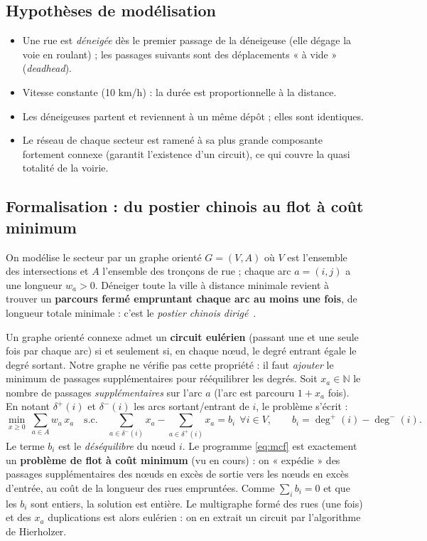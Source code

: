 \documentclass[11pt,a4paper]{article}
\begin{document}
\subsection{Hypothèses de modélisation}
\begin{itemize}
\item Une rue est \emph{déneigée} dès le premier passage de la déneigeuse (elle
dégage la voie en roulant) ; les passages suivants sont des déplacements
« à vide » (\emph{deadhead}).
\item Vitesse constante (10 km/h) : la durée est proportionnelle à la distance.
\item Les déneigeuses partent et reviennent à un même dépôt ; elles sont
identiques.
\item Le réseau de chaque secteur est ramené à sa plus grande composante
fortement connexe (garantit l'existence d'un circuit), ce qui couvre la quasi
totalité de la voirie.
\end{itemize}

\subsection{Formalisation : du postier chinois au flot à coût minimum}
On modélise le secteur par un graphe orienté $G=(V,A)$ où $V$ est l'ensemble des
intersections et $A$ l'ensemble des tronçons de rue ; chaque arc $a=(i,j)$ a une
longueur $w_a>0$. Déneiger toute la ville à distance minimale revient à trouver
un \textbf{parcours fermé empruntant chaque arc au moins une fois}, de longueur
totale minimale : c'est le \emph{postier chinois dirigé}~\cite{edmonds1973}.

Un graphe orienté connexe admet un \textbf{circuit eulérien} (passant une et une
seule fois par chaque arc) si et seulement si, en chaque nœud, le degré entrant
égale le degré sortant. Notre graphe ne vérifie pas cette propriété : il faut
\emph{ajouter} le minimum de passages supplémentaires pour rééquilibrer les
degrés. Soit $x_a\in\mathbb{N}$ le nombre de passages \emph{supplémentaires} sur
l'arc $a$ (l'arc est parcouru $1+x_a$ fois). En notant $\delta^+(i)$ et
$\delta^-(i)$ les arcs sortant/entrant de $i$, le problème s'écrit :
\begin{equation}
\min_{x\ge 0}\ \sum_{a\in A} w_a\, x_a
\quad\text{s.c.}\quad
\sum_{a\in\delta^-(i)} x_a-\!\!\sum_{a\in\delta^+(i)} x_a = b_i\ \ \forall i\in V,
\qquad b_i=\deg^+(i)-\deg^-(i).
\label{eq:mcf}
\end{equation}
Le terme $b_i$ est le \emph{déséquilibre} du nœud $i$. Le programme
\eqref{eq:mcf} est exactement un \textbf{problème de flot à coût minimum} (vu en
cours) : on « expédie » des passages supplémentaires des nœuds en excès de
sortie vers les nœuds en excès d'entrée, au coût de la longueur des rues
empruntées. Comme $\sum_i b_i=0$ et que les $b_i$ sont entiers, la solution est
entière. Le multigraphe formé des rues (une fois) et des $x_a$ duplications est
alors eulérien : on en extrait un circuit par l'algorithme de Hierholzer.
\end{document}
